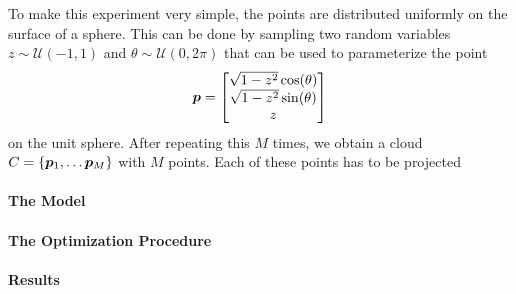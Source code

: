 		To make this experiment very simple, the points are distributed uniformly on the surface of a sphere.
		This can be done by sampling two random variables $z \sim \mathcal{U}(-1, 1)$ and $\theta \sim \mathcal{U}(0, 2\pi)$ that can be used to parameterize the point
		\begin{equation}
			\bm{p} = 
			\begin{bmatrix}
				\sqrt{1 - z^2} \cos(\theta) \\ 
				\sqrt{1 - z^2} \sin(\theta) \\
				z
			\end{bmatrix}
		\end{equation}
		on the unit sphere. 
		After repeating this $M$ times, we obtain a cloud $C = \{\vectr{p}_1, \dots \vectr{p}_M\}$ with $M$ points.
		Each of these points has to be projected
		
		
		\paragraph{The Model}
		
		\paragraph{The Optimization Procedure}
		
		\paragraph{Results}
		
		\paragraph{}
	